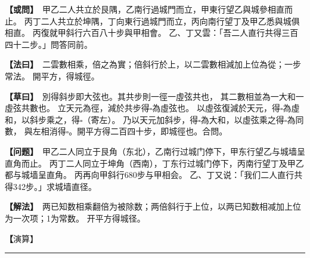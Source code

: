\documentclass[11pt,a4paper]{article}
\let\origsquare\square
\renewcommand{\square}{\ensuremath{\origsquare}}%
\newcommand{\longline}{\noindent\rule{\textwidth}{0.4pt}}
\newcommand{\clOWEN}[1]{%
  \par\vspace{0.3em}%
  \noindent\textcolor{problemcolor}{\textbf{【或問】}}\,{\tradfont #1}\par\nopagebreak%
}
\newcommand{\mdOWEN}[1]{%
  \par\vspace{0.3em}%
  \noindent\textcolor{problemcolor}{\textbf{【问题】}}\,{\modfont #1}\par\nopagebreak%
}
\newcommand{\clFAYUE}[1]{%
  \par\noindent\textcolor{methodcolor}{\textbf{【法曰】}}\,{\tradfont #1}\par\nopagebreak%
}
\newcommand{\mdFAYUE}[1]{%
  \par\noindent\textcolor{methodcolor}{\textbf{【解法】}}\,{\modfont #1}\par\nopagebreak%
}
\newcommand{\clTSAOYUE}[1]{%
  \par\noindent\textcolor{workcolor}{\textbf{【草曰】}}\,{\tradfont #1}\par%
}
\newcommand{\mdTSAOYUE}[1]{%
  \par\noindent\textcolor{workcolor}{\textbf【演算】}}\,{\modfont #1}\par%
\begin{document}
\begin{paracol}{2}

\begin{leftcolumn}
\clOWEN{%
甲乙二人共立於艮隅，乙南行過城門而立，甲東行望乙與城參相直而止。
丙丁二人共立於坤隅，丁向東行過城門而立，丙向南行望丁及甲乙悉與城俱相直。
丙復就甲斜行六百八十步與甲相會。
乙、丁又雲：「吾二人直行共得三百四十二步。」問答同前。}

\clFAYUE{%
二雲數相乘，倍之為實；倍斜行於上，以二雲數相減加上位為從；一步常法。
開平方，得城徑。}

\clTSAOYUE{%
別得斜步即大弦也。其共步則一徑一虛弦共也，
其二數相並為一大和一虛弦共數也。
立天元為徑，減於共步得$\square$為虛弦也。
以虛弦復減於天元，得$\square$為虛和，以斜步乘之，得$\square$（寄左）。
乃以天元加斜步，得$\square$為大和，以虛弦乘之得$\square$為同數，
與左相消得$\square$。開平方得二百四十步，即城徑也。合問。}
\end{leftcolumn}

\switchcolumn

\begin{rightcolumn}
\mdOWEN{%
甲乙二人同立于艮角（东北），乙南行过城门停下，甲东行望乙与城墙呈直角而止。
丙丁二人同立于坤角（西南），丁东行过城门停下，丙南行望丁及甲乙都与城墙呈直角。
丙再向甲斜行680步与甲相会。
乙、丁又说：「我们二人直行共得342步。」求城墙直径。}

\mdFAYUE{%
两已知数相乘翻倍为被除数；两倍斜行于上位，以两已知数相减加上位为一次项；1为常数。
开平方得城径。}

\mdTSAOYUE{%
辨识得：斜步即大弦。共步即一径一虚弦之和，
两数相并为一大和一虚弦之共数。
设天元为径，从共步中减去得$\square$为虚弦。
以虚弦再从天元中减去得$\square$为虚和，以斜步乘之得$\square$（寄左）。
以天元加斜步得$\square$为大和，以虚弦乘之得$\square$为同数，
与左式相消得$\square$。开平方得240步，即城径。符合所问。}
\end{rightcolumn}

\end{paracol}

\vspace{0.3cm}
\begin{center}\longline\end{center}
\end{document}
